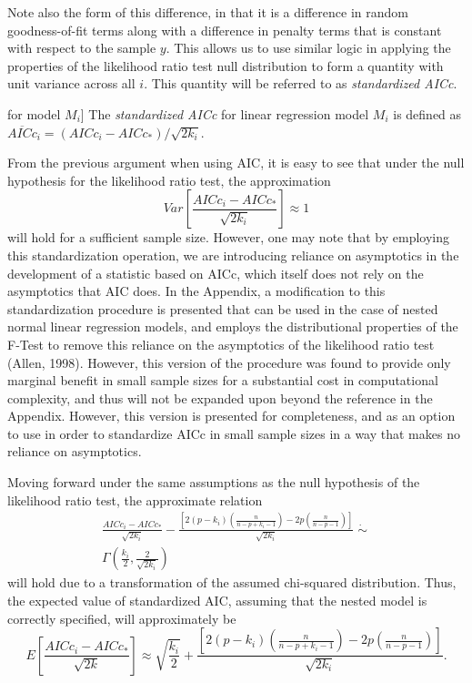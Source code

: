 		Note also the form of this difference, in that it is a difference in random goodness-of-fit terms along with a difference in penalty terms that is constant with respect to the
		sample $y$. This allows us to use similar logic in applying the properties of the likelihood ratio test null distribution to form a quantity with unit variance
		across all $i$. This quantity will be referred to as \textit{standardized AICc}.

		\begin{definition}[Standardized AICc [linear regression] for model $M_i$]
			The \textit{standardized AICc} for linear regression model $M_i$ is defined as $\overline{AICc}_i = (AICc_i - AICc_*) / \sqrt{2k_i}$.
		\end{definition}

		From the previous argument when using AIC, it is easy to see that under the null hypothesis for the likelihood ratio test, the approximation
		\begin{equation*}
			Var \left[ \frac{AICc_i - AICc_*}{\sqrt{2k_i}} \right] \approx 1 
		\end{equation*}
		will hold for a sufficient sample size. However, one may note that by employing this standardization operation, we are introducing reliance on asymptotics in the development of a
		statistic based on AICc, which itself does not rely on the asymptotics that AIC does. In the Appendix, a modification to this standardization procedure is presented that can
		be used in the case of nested normal linear regression models, and employs the distributional properties of the F-Test to remove this reliance on the asymptotics of the
		likelihood ratio test (Allen, 1998). However, this version of the procedure was found to provide only marginal benefit in small sample sizes for a substantial cost in
		computational complexity, and thus will not be expanded upon beyond the reference in the Appendix. However, this version is presented for completeness, and as an option to use
		in order to standardize AICc in small sample sizes in a way that makes no reliance on asymptotics.
		
		Moving forward under the same assumptions as the null hypothesis of the likelihood ratio test, the approximate relation
		\begin{equation*}
			\begin{split}
				\frac{AICc_i - AICc_*}{\sqrt{2k_i}} - \frac{\left[ 2(p-k_i) \left( \frac{n}{n-p+k_i-1} \right) - 2p \left( \frac{n}{n-p-1} \right) \right]}{\sqrt{2k_i}} \; \dot\sim \; \\ 
				\Gamma \left( \frac{k_i}{2}, \frac{2}{\sqrt{2k_i}} \right)
			\end{split}
		\end{equation*}
		will hold due to a transformation of the assumed chi-squared distribution. Thus, the expected value of standardized AIC, assuming
		that the nested model is correctly specified, will approximately be
		\begin{equation*}
			E \left[ \frac{AICc_i - AICc_*}{\sqrt{2k}} \right] \approx \sqrt{\frac{k_i}{2}} + \frac{\left[ 2(p-k_i) \left( \frac{n}{n-p+k_i-1} \right) - 2p \left( \frac{n}{n-p-1} \right) \right]}{\sqrt{2k_i}} .
		\end{equation*}


